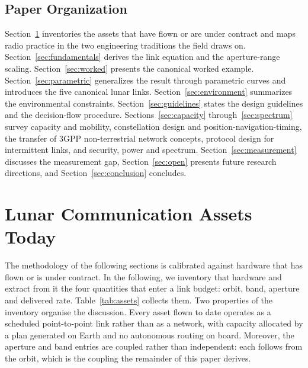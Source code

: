 \documentclass[11pt,a4paper]{article}
\begin{document}
\subsection{Paper Organization}
Section~\ref{sec:assets} inventories the assets that have flown or are under contract and maps radio practice in the two engineering traditions the field draws on. Section~\ref{sec:fundamentals} derives the link equation and the aperture-range scaling. Section~\ref{sec:worked} presents the canonical worked example. Section~\ref{sec:parametric} generalizes the result through parametric curves and introduces the five canonical lunar links. Section~\ref{sec:environment} summarizes the environmental constraints. Section~\ref{sec:guidelines} states the design guidelines and the decision-flow procedure. Sections~\ref{sec:capacity} through~\ref{sec:spectrum} survey capacity and mobility, constellation design and position-navigation-timing, the transfer of 3GPP non-terrestrial network concepts, protocol design for intermittent links, and security, power and spectrum. Section~\ref{sec:measurement} discusses the measurement gap, Section~\ref{sec:open} presents future research directions, and Section~\ref{sec:conclusion} concludes.


\section{Lunar Communication Assets Today}
\label{sec:assets}

The methodology of the following sections is calibrated against hardware that has flown or is under contract. In the following, we inventory that hardware and extract from it the four quantities that enter a link budget: orbit, band, aperture and delivered rate. Table~\ref{tab:assets} collects them. Two properties of the inventory organise the discussion. Every asset flown to date operates as a scheduled point-to-point link rather than as a network, with capacity allocated by a plan generated on Earth and no autonomous routing on board. Moreover, the aperture and band entries are coupled rather than independent: each follows from the orbit, which is the coupling the remainder of this paper derives.
\end{document}
